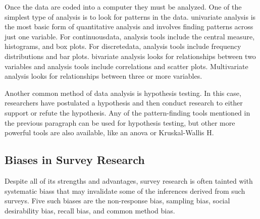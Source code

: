 Once the data are coded into a computer they must be analyzed. One of the simplest type of analysis is to look for patterns in the data. \Gls{univariate} analysis is the most basic form of quantitative analysis and involves finding patterns across just one variable. For \gls{continuousdata}, analysis tools include the central measure, histograms, and box plots. For \gls{discretedata}, analysis tools include frequency distributions and bar plots. \Gls{bivariate} analysis looks for relationships between two variables and analysis tools include correlations and scatter plots. Multivariate analysis looks for relationships between three or more variables. 

Another common method of data analysis is hypothesis testing. In this case, researchers have postulated a \gls{hypothesis} and then conduct research to either support or refute the hypothesis. Any of the pattern-finding tools mentioned in the previous paragraph can be used for hypothesis testing, but other more powerful tools are also available, like an \gls{anova} or Kruskal-Wallis H.

\subsection{Biases in Survey Research}

Despite all of its strengths and advantages, survey research is often tainted with systematic \glspl{bias} that may invalidate some of the inferences derived from such surveys. Five such biases are the non-response bias, sampling bias, social desirability bias, recall bias, and common method bias.

